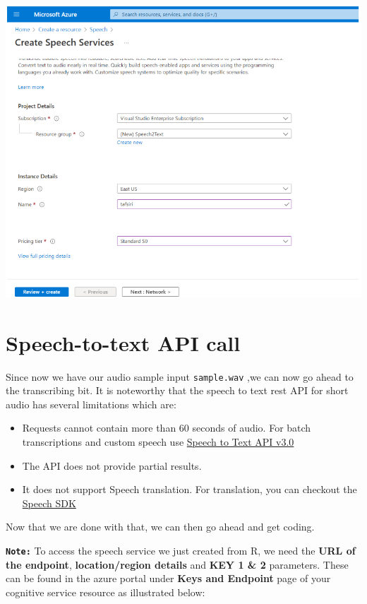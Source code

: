 \documentclass[
  letterpaper,
  DIV=11,
  numbers=noendperiod]{scrreprt}
\begin{document}
\includegraphics{./images/creating speech service.png}

\hypertarget{speech-to-text-api-call}{%
\section{Speech-to-text API call}\label{speech-to-text-api-call}}

Since now we have our audio sample input \texttt{sample.wav} ,we can now
go ahead to the transcribing bit. It is noteworthy that the speech to
text rest API for short audio has several limitations which are:

\begin{itemize}
\item
  Requests cannot contain more than 60 seconds of audio. For batch
  transcriptions and custom speech use
  \href{https://docs.microsoft.com/en-us/azure/cognitive-services/speech-service/rest-speech-to-text}{Speech
  to Text API v3.0}
\item
  The API does not provide partial results.
\item
  It does not support Speech translation. For translation, you can
  checkout the
  \href{https://docs.microsoft.com/en-us/azure/cognitive-services/speech-service/speech-sdk}{Speech
  SDK}
\end{itemize}

Now that we are done with that, we can then go ahead and get coding.

\textbf{\texttt{Note:}} To access the speech service we just created
from R, we need the \textbf{URL of the endpoint},
\textbf{location/region details} and \textbf{KEY 1 \& 2} parameters.
These can be found in the azure portal under \textbf{Keys and Endpoint}
page of your cognitive service resource as illustrated below:
\end{document}
